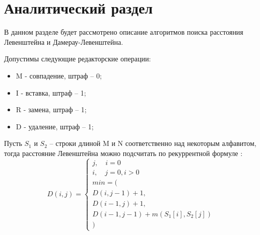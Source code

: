 \chapter{Аналитический раздел}
\label{cha:analysis}
В данном разделе будет рассмотрено описание алгоритмов поиска расстояния Левенштейна и Дамерау-Левенштейна\cite{Lowenstein}.
\par Допустимы следующие редакторские операции:
\begin{itemize}
	\item M - совпадение, штраф -- 0;
	\item I - вставка, штраф -- 1;
	\item R - замена, штраф -- 1;
	\item D - удаление, штраф -- 1;
\end{itemize}
\par Пусть $ S_{1} $  и $ S_{2} $ -- строки длиной M и N соответственно над некоторым алфавитом, тогда расстояние Левенштейна можно подсчитать по рекуррентной формуле \cite{habr}:
\begin{equation}
D(i, j) = \begin{cases}
j, \quad i = 0\\
i, \quad j = 0, i > 0\\
min = (\\
D(i,j-1) + 1,\\
D(i-1, j) + 1,\\
D(i-1, j-1)+m(S_{1}[i],S_{2}[j])\\
)
\end{cases}
\end{equation}

